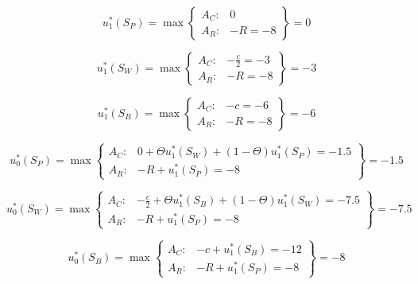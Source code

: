 \documentclass{article}
\begin{document}
\begin{equation}
    u_{1}^{*}(S_P) = \max
    \left\{\begin{matrix}
    A_C: & 0 \\
    A_R: & -R = -8
    \end{matrix}\right\}
    = 0
\end{equation}

\begin{equation}
    u_{1}^{*}(S_W) = \max
    \left\{\begin{matrix}
    A_C: & -\frac{c}{2} = -3 \\
    A_R: & -R = -8
    \end{matrix}\right\}
    = -3
\end{equation}


\begin{equation}
    u_{1}^{*}(S_B) = \max
    \left\{\begin{matrix}
    A_C: & -c = -6\\
    A_R: & -R = -8
    \end{matrix}\right\}
    = -6
\end{equation}


\begin{equation}
    u_{0}^{*}(S_P) = \max
    \left\{\begin{matrix}
    A_C: & 0 + \Theta u_{1}^{*}(S_W) + (1 - \Theta)u_{1}^{*}(S_P) = -1.5 \\
    A_R: & -R + u_{1}^{*}(S_P) = -8
    \end{matrix}\right\}
    = -1.5
\end{equation}

\begin{equation}
    u_{0}^{*}(S_W) = \max
    \left\{\begin{matrix}
    A_C: & -\frac{c}{2} + \Theta u_{1}^{*}(S_B) + (1 - \Theta)u_{1}^{*}(S_W) = -7.5\\
    A_R: & -R +  u_{1}^{*}(S_P) = -8
    \end{matrix}\right\}
    = -7.5
\end{equation}

\begin{equation}
    u_{0}^{*}(S_B) = \max
    \left\{\begin{matrix}
    A_C: & -c + u_{1}^{*}(S_B) = -12\\
    A_R: & -R + u_{1}^{*}(S_P) = -8
    \end{matrix}\right\}
    = -8
\end{equation}
\end{document}
